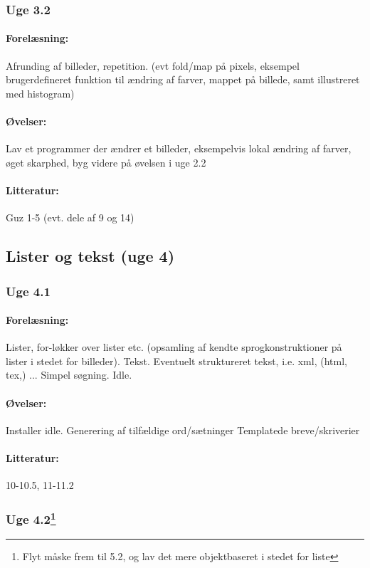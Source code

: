 \documentclass[12pt]{article}
\begin{document}
\subsubsection{Uge 3.2}
\paragraph{Forelæsning:} 
Afrunding af billeder, repetition.
(evt fold/map på pixels, eksempel brugerdefineret funktion til ændring af farver, mappet på billede, samt illustreret med histogram)

\paragraph{Øvelser:}
Lav et programmer der ændrer et billeder,
eksempelvis lokal ændring af farver, øget skarphed,
byg videre på øvelsen i uge 2.2
\paragraph{Litteratur:} Guz 1-5 (evt. dele af 9 og 14)

\subsection{Lister og tekst (uge 4)}
\subsubsection{Uge 4.1}
\paragraph{Forelæsning:} 
Lister, for-løkker over lister etc. (opsamling af kendte sprogkonstruktioner på lister i stedet for billeder).
Tekst. Eventuelt struktureret tekst, i.e. xml, (html, tex,) ... Simpel søgning.
Idle.
\paragraph{Øvelser:}
Installer idle.
Generering af tilfældige ord/sætninger
Templatede breve/skriverier
\paragraph{Litteratur:} 10-10.5, 11-11.2

\subsubsection{Uge 4.2\footnote{Flyt måske frem til 5.2, og lav det mere objektbaseret i stedet for liste}}
\end{document}
